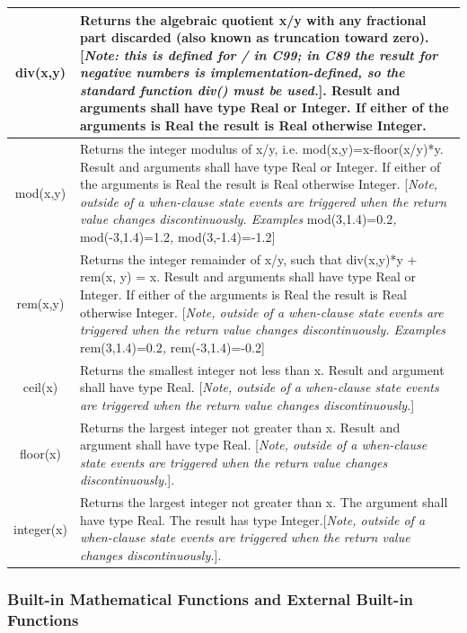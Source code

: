 \documentclass[10pt,a4paper]{report}
\def\doublelabel#1{\label{#1}\hypertarget{#1}{}}
\begin{document}
\begin{longtable}{|c|p{8cm}|} \hline
div(x,y) & Returns the algebraic quotient x/y with any fractional part
discarded (also known as truncation toward zero). {[}\emph{Note: this is
defined for / in C99; in C89 the result for negative numbers is
implementation-defined, so the standard function div() must be
used.}{]}. Result and arguments shall have type Real or Integer. If
either of the arguments is Real the result is Real otherwise
Integer.\\ \hline
mod(x,y) & Returns the integer modulus of x/y, i.e.
mod(x,y)=x-floor(x/y)*y. Result and arguments shall have type Real or
Integer. If either of the arguments is Real the result is Real otherwise
Integer. {[}\emph{Note, outside of a when-clause state events are
triggered when the return value changes discontinuously. Examples}
mod(3,1.4)=0.2\emph{,} mod(-3,1.4)=1.2\emph{,}
mod(3,-1.4)=-1.2{]}\\ \hline
rem(x,y) & Returns the integer remainder of x/y, such that div(x,y)*y +
rem(x, y) = x. Result and arguments shall have type Real or Integer. If
either of the arguments is Real the result is Real otherwise Integer.
{[}\emph{Note, outside of a when-clause state events are triggered when
the return value changes discontinuously. Examples}
rem(3,1.4)=0.2\emph{,} rem(-3,1.4)=-0.2{]}\\ \hline
ceil(x) & Returns the smallest integer not less than x. Result and
argument shall have type Real. {[}\emph{Note, outside of a when-clause
state events are triggered when the return value changes
discontinuously.}{]}\\ \hline
floor(x) & Returns the largest integer not greater than x. Result and
argument shall have type Real. {[}\emph{Note, outside of a when-clause
state events are triggered when the return value changes
discontinuously.}{]}.\\ \hline
integer(x) & Returns the largest integer not greater
than x. The argument shall have type Real. The result has type
Integer.{[}\emph{Note, outside of a when-clause state
events are triggered when the return value changes
discontinuously.}{]}.\\ \hline
\end{longtable}

\subsubsection{Built-in Mathematical Functions and External Built-in Functions}\doublelabel{built-in-mathematical-functions-and-external-built-in-functions}
\end{document}
